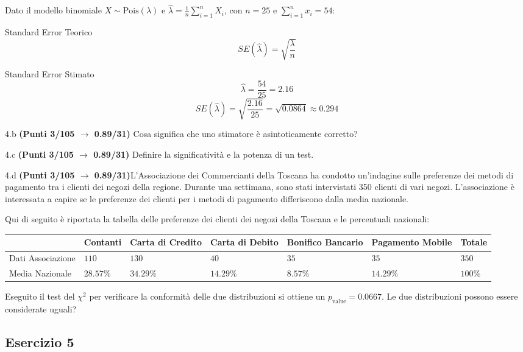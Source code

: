 \documentclass[
  11pt,
]{book}
\theoremstyle{mytheoremstyle}
\theoremstyle{mydefstyle}
\newenvironment{sol}
  {
  \begin{tcolorbox}[enhanced,breakable,arc=0.1mm,boxrule=1pt,colback=white,colframe=iblue,
  title=\bf \fontfamily{lmss}\selectfont \hspace{.5 cm} Soluzione,drop fuzzy shadow]

}{
\end{tcolorbox}
  }
\begin{document}
\begin{sol}
Dato il modello binomiale \(X \sim \text{Pois}(\lambda)\) e \(\hat\lambda = \frac{1}{n} \sum_{i=1}^n X_i\), con \(n = 25\) e \(\sum_{i=1}^n x_i = 54\):

Standard Error Teorico
\[
SE(\hat\lambda) = \sqrt{\frac{\lambda}{n}}
\]

Standard Error Stimato
\[
\hat\lambda = \frac{54}{25} = 2.16
\]
\[
SE(\hat\lambda) = \sqrt{\frac{2.16}{25}} = \sqrt{0.0864} \approx 0.294
\]

\end{sol}

4.b \textbf{(Punti 3/105 \(\rightarrow\) 0.89/31)} Cosa significa che uno stimatore è asintoticamente corretto?

4.c \textbf{(Punti 3/105 \(\rightarrow\) 0.89/31)} Definire la significatività e la potenza di un test.

4.d \textbf{(Punti 3/105 \(\rightarrow\) 0.89/31)}L'Associazione dei Commercianti della Toscana ha condotto un'indagine sulle preferenze dei metodi di pagamento tra i clienti dei negozi della regione. Durante una settimana, sono stati intervistati 350 clienti di vari negozi. L'associazione è interessata a capire se le preferenze dei clienti per i metodi di pagamento differiscono dalla media nazionale.

Qui di seguito è riportata la tabella delle preferenze dei clienti dei negozi della Toscana e le percentuali nazionali:

\begin{table}[H]
\centering
\begin{tabular}{lllllll}
\toprule
  & Contanti & Carta di Credito & Carta di Debito & Bonifico Bancario & Pagamento Mobile & Totale\\
\midrule
Dati Associazione & $110$ & $130$ & $40$ & $35$ & $35$ & $350$\\
Media Nazionale & $28.57\%$ & $34.29\%$ & $14.29\%$ & $8.57\%$ & $14.29\%$ & $100\%$\\
\bottomrule
\end{tabular}
\end{table}

Eseguito il test del \(\chi^2\) per verificare la conformità delle due distribuzioni si ottiene un \(p_\text{value}=0.0667\). Le due distribuzioni possono essere considerate uguali?

\subsection{Esercizio 5}\label{esercizio-5-40}
\end{document}
